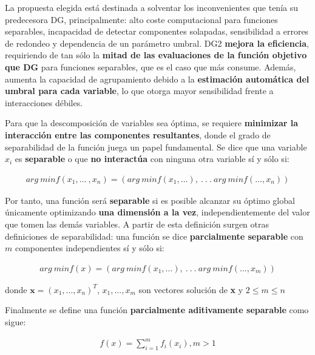 La propuesta elegida está destinada a solventar los inconvenientes que tenía su predecesora DG, principalmente: alto coste computacional para funciones separables, incapacidad de detectar componentes solapadas, sensibilidad a errores de redondeo y dependencia de un parámetro umbral. DG2 \textbf{mejora la eficiencia}, requiriendo de tan sólo la \textbf{mitad de las evaluaciones de la función objetivo que DG} para funciones separables, que es el caso que más consume. Además, aumenta la capacidad de agrupamiento debido a la \textbf{estimación automática del umbral para cada variable}, lo que otorga mayor sensibilidad frente a interacciones débiles.

Para que la descomposición de variables sea óptima, se requiere \textbf{minimizar la interacción entre las componentes resultantes}, donde el grado de separabilidad de la función juega un papel fundamental. Se dice que una variable $x_i$ es \textbf{separable} o que \textbf{no interactúa} con ninguna otra variable\cite{DG} sí y sólo si:

\begin{equation}\label{eq:separable}
	\begin{gathered}
	arg \ minf(x_1,...\ ,x_n) = (arg \ min f(x_1,...), \ . \ . \ . \ arg \ min f(...,x_n))
	\end{gathered}
\end{equation}
 
Por tanto, una función será \textbf{separable} si es posible alcanzar su óptimo global únicamente optimizando \textbf{una dimensión a la vez}, independientemente del valor que tomen las demás variables. A partir de esta definición surgen otras definiciones de separabilidad: una función se dice \textbf{parcialmente separable} con $m$ componentes independientes sí y sólo si:

\begin{equation}\label{eq:partSeparable}
	\begin{gathered}
		arg \ minf(x) = (arg \ min f(x_1,...), \ . \ . \ . \ arg \ min f(...,x_m))
	\end{gathered}
\end{equation}

donde $\textbf{x}=(x_1,...,x_n)^T$, $x_1,...,x_m$ son vectores solución de \textbf{x} y $2 \leq m \leq n$

Finalmente se define una función \textbf{parcialmente aditivamente separable} como sigue:

\begin{equation}\label{eq:addPartSeparable}
	\begin{gathered}
		f(x) = \sum_{i=1}^{m} f_i(x_i), m > 1
	\end{gathered}
\end{equation}


